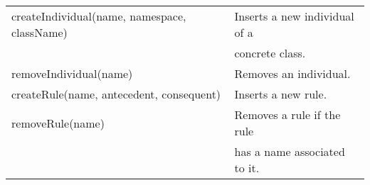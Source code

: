 \begin{center}
\begin{longtable}{l l}
  \hline 
  createIndividual(name, namespace, className)& Inserts a new individual of a \\
					& concrete class.		\\
  removeIndividual(name)	 	& Removes an individual.	\\

  \hline 
  createRule(name, antecedent, consequent)& Inserts a new rule.		\\
  removeRule(name)	 		& Removes a rule if the rule 	\\
					& has a name associated to it.	\\
  \hline
\end{longtable}
\end{center}